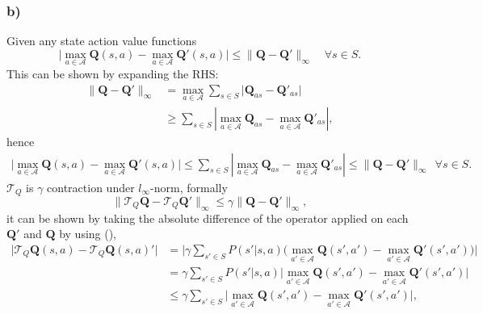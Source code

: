 \documentclass[12pt]{article}
\begin{document}
\subsubsection*{b)}
Given any state action value functions
\begin{equation}
    \Big|\max_{a \in \mathcal{A}}\mathbf{Q}(s,a) - \max_{a \in \mathcal{A}}\mathbf{Q'}(s,a)\Big| \leq \|\mathbf{Q}-\mathbf{Q'}\|_{\infty} \quad \forall s\in S.
    \label{eq:qboundinfnorm}
\end{equation}
This can be shown by expanding the RHS:
\begin{equation*}
    \begin{split}
        \|\mathbf{Q}-\mathbf{Q'}\|_{\infty} &= \max_{a \in \mathcal{A}}\sum_{s\in S} \Big|\mathbf{Q}_{as} - \mathbf{Q}'_{as}\Big| \\
        &\geq \sum_{s\in S} \left|\max_{a \in \mathcal{A}} \mathbf{Q}_{as} - \max_{a \in \mathcal{A}} \mathbf{Q}'_{as}\right|,
    \end{split}
\end{equation*}
hence
\begin{equation*}
    \begin{split}
        \Big|\max_{a \in \mathcal{A}}\mathbf{Q}(s,a) - \max_{a \in \mathcal{A}}\mathbf{Q'}(s,a)\Big| \leq \sum_{s\in S} \left|\max_{a \in \mathcal{A}} \mathbf{Q}_{as} - \max_{a \in \mathcal{A}} \mathbf{Q}'_{as}\right| \leq \|\mathbf{Q}-\mathbf{Q'}\|_{\infty} ~~ \forall s \in S.
    \end{split}
\end{equation*}
$\mathcal{T}_Q$ is $\gamma$ contraction under $l_\infty$-norm, formally
\begin{equation}
    \|\mathcal{T}_Q\mathbf{Q}-\mathcal{T}_Q\mathbf{Q}'\|_\infty \leq \gamma \|\mathbf{Q}-\mathbf{Q'}\|_\infty,
\end{equation}
it can be shown by taking the absolute difference of the operator applied on each $\mathbf{Q}'$ and $\mathbf{Q}$ by using (),
\begin{equation*}
    \begin{split}
        \Big|\mathcal{T}_Q\mathbf{Q}(s,a)-\mathcal{T}_Q\mathbf{Q}(s,a)'\Big| &= \Big|\gamma \sum_{s'\in S}P(s'|s,a)\Big(\max_{a' \in \mathcal{A}}\mathbf{Q}(s',a')-\max_{a' \in \mathcal{A}}\mathbf{Q}'(s',a')\Big)\Big| \\
        &= \gamma \sum_{s'\in S}P(s'|s,a)\Big|\max_{a' \in \mathcal{A}}\mathbf{Q}(s',a')-\max_{a' \in \mathcal{A}}\mathbf{Q}'(s',a')\Big| \\
        &\leq \gamma \sum_{s'\in S} \Big|\max_{a' \in \mathcal{A}}\mathbf{Q}(s',a')-\max_{a' \in \mathcal{A}}\mathbf{Q}'(s',a')\Big|, \\
    \end{split}
\end{equation*}
\end{document}
